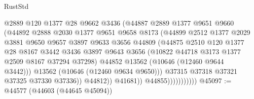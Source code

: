 \begin{lexlean}{RustStd}
\begin{coremodule}
                                  @2889
                                  @120
                                  @1377
                                  @28
                                  @9662
                                  @3436
                                  (@44887
                                    @2889
                                    @1377
                                    @9651
                                    @9660
                                    (@44892
                                      @2888
                                      @2030
                                      @1377
                                      @9651
                                      @9658
                                      @8173
                                      (@44899
                                        @2512
                                        @1377
                                        @2029
                                        @3881
                                        @9650
                                        @9657
                                        @3897
                                        @9633
                                        @3656
                                        @44809
                                        (@44875
                                          @2510
                                          @120
                                          @1377
                                          @28
                                          @8167
                                          @3442
                                          @3436
                                          @3897
                                          @9643
                                          @3656
                                          (@10822 @44718 @3173 @1377 @2509 @8167 @37294 @37298)
                                          @44852
                                          @13562
                                          (@10646 (@12460 @9644 @3442)))
                                        @13562
                                        (@10646 (@12460 @9634 @9650)))
                                      @37315
                                      @37318
                                      @37321
                                      @37325
                                      @37330
                                      @37336))
                                  @44812))
                              @41681))
                          @44855)))))))))))
@45097 := @44577 (@44603 (@44645 @45094))

\end{coremodule}
\end{lexlean}
